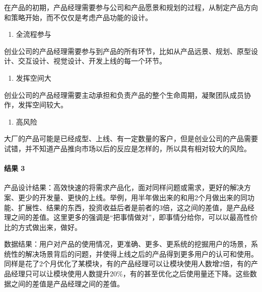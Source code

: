 \documentclass[letterpaper,11pt,english]{sphinxmanual}
\begin{document}
在产品的初期，产品经理需要参与公司和产品愿景和规划的过程，从制定产品方向和策略开始，而不仅仅是考虑产品功能的设计。
\begin{enumerate}
%
\setcounter{enumi}{1}
\item {} 
全流程参与

\end{enumerate}

创业公司的产品经理需要参与到产品的所有环节，比如从产品远景、规划、原型设计、交互设计、视觉设计、开发上线的每一个环节。
\begin{enumerate}
%
\setcounter{enumi}{2}
\item {} 
发挥空间大

\end{enumerate}

创业公司的产品经理需要主动承担和负责产品的整个生命周期，凝聚团队成员协作，发挥空间较大。
\begin{enumerate}
%
\setcounter{enumi}{3}
\item {} 
高风险

\end{enumerate}

大厂的产品可能是已经成型、上线、有一定数量的客户，但是创业公司的产品需要试错，并不知道产品推向市场以后的反应是怎样的，所以具有相对较大的风险。


\paragraph{结果 3\sphinxfootnotemark[59]}
\label{\detokenize{chapter_introduction/PM:id20}}%
\begin{footnotetext}[59]\sphinxAtStartFootnote
{}
%
\end{footnotetext}\ignorespaces 
产品设计结果：高效快速的将需求产品化，面对同样问题或需求，更好的解决方案、更少的开发量、更快的上线。举例，用半年做出来的和用2个月做出来的同功能、扩展性、结果的东西，投资收益后者是前者的3倍，这之间的差值，是产品经理之间的差值。这里更多的强调是“把事情做对”，即事情分给你，可以以最高性价比的方式做出来，做好。

数据结果：用户对产品的使用情况，更准确、更多、更系统的挖掘用户的场景，系统性的解决场景背后的问题，并使得上线之后的产品得到更多用户的认可和使用。同样是花了2个月优化了某模块，有的产品经理可以让模块使用人数增2倍，有的产品经理只可以让模块使用人数提升20\%，有的甚至优化之后使用量还下降。这些数据之间的差值是产品经理之间的差值。
\end{document}
